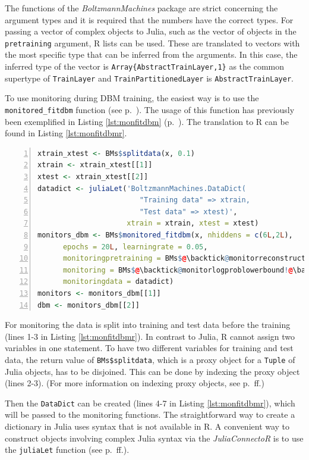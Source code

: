 \documentclass[12pt]{article}
\newcommand{\inlinecode}[1]{\texttt{#1}}
\newcommand{\apkg}[1]{\emph{#1}}
\begin{document}
The functions of the \apkg{BoltzmannMachines} package are strict concerning the argument types and it is required that the numbers have the correct types.
For passing a vector of complex objects to Julia, such as the vector of objects in the \inlinecode{pretraining} argument, R lists can be used.
These are translated to vectors with the most specific type that can be inferred from the arguments.
In this case, the inferred type of the vector is \inlinecode{Array\{AbstractTrainLayer,1\}} as the common supertype of \inlinecode{TrainLayer} and \inlinecode{TrainPartitionedLayer} is \inlinecode{AbstractTrainLayer}.

To use monitoring during DBM training, the easiest way is to use the \inlinecode{monitored\_fitdbm} function (see p.~\pageref{bms_monitored_fitdbm}).
The usage of this function has previously been exemplified in Listing \ref{lst:monfitdbm} (p.~\pageref{lst:monfitdbm}).
The translation to R can be found in Listing \ref{lst:monfitdbmr}.

\begin{lstlisting}[language=R,caption={Monitoring pre-training and fine-tuning}, label={lst:monfitdbmr}, float = !h, numbers=left,style=rlststyle]
xtrain_xtest <- BMs$splitdata(x, 0.1)
xtrain <- xtrain_xtest[[1]]
xtest <- xtrain_xtest[[2]]
datadict <- juliaLet('BoltzmannMachines.DataDict(
                        "Training data" => xtrain,
                        "Test data" => xtest)',
                     xtrain = xtrain, xtest = xtest)
monitors_dbm <- BMs$monitored_fitdbm(x, nhiddens = c(6L,2L),
      epochs = 20L, learningrate = 0.05,
      monitoringpretraining = BMs$@\backtick@monitorreconstructionerror!@\backtick@,
      monitoring = BMs$@\backtick@monitorlogproblowerbound!@\backtick@,
      monitoringdata = datadict)
monitors <- monitors_dbm[[1]]
dbm <- monitors_dbm[[2]]
\end{lstlisting}

For monitoring the data is split into training and test data before the training (lines 1-3 in Listing \ref{lst:monfitdbmr}).
In contrast to Julia, R cannot assign two variables in one statement.
To have two different variables for training and test data, the return value of \inlinecode{BMs\$splitdata}, which is a proxy object for a \inlinecode{Tuple} of Julia objects, has to be disjoined.
This can be done by indexing the proxy object (lines 2-3).
(For more information on indexing proxy objects, see p.~\pageref{rdokitem_AccessMutate.JuliaProxy}ff.)

Then the \inlinecode{DataDict} can be created (lines 4-7 in Listing \ref{lst:monfitdbmr}), which will be passed to the monitoring functions.
The straightforward way to create a dictionary in Julia uses syntax that is not available in R.
A convenient way to construct objects involving complex Julia syntax via the \apkg{JuliaConnectoR} is to use the \inlinecode{juliaLet} function (see p.~\pageref{rdokitem_juliaLet}ff.).
\end{document}
